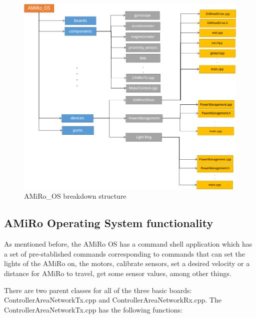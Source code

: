 \documentclass[12pt]{report}%
\begin{document}
\begin{figure}[ht]
	\centering
	\includegraphics[width=\textwidth]{AMiRo_OS}
    \caption{AMiRo\_OS breakdown structure}
    \label{fig:OS}
\end{figure}

\subsection{AMiRo Operating System functionality}
As mentioned before, the AMiRo OS has a command shell application which has a set of pre-stablished commands corresponding to commands that can set the lights of the AMiRo on, the motors, calibrate sensors, set a desired velocity or a distance for AMiRo to travel, get some sensor values, among other things.

There are two parent classes for all of the three basic boards: ControllerAreaNetworkTx.cpp and ControllerAreaNetworkRx.cpp. The ControllerAreaNetworkTx.cpp has the following functions:
\end{document}
